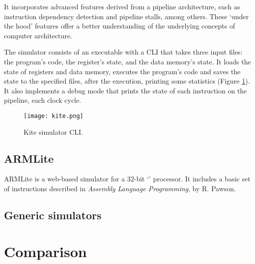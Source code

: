 It incorporates advanced features derived from a \gls{pipeline} architecture, such as \gls{instruction dependency} detection and \gls{pipeline stalls}, among others. These `under the hood' features offer a better understanding of the underlying concepts of computer architecture.

The simulator consists of an executable with a \gls{CLI} that takes three input files: the program's code, the register's state, and the data memory's state. It loads the state of registers and data memory, executes the program's code and saves the state to the specified files, after the execution, printing some statistics (Figure \ref{fig:kite}). It also implements a \gls{debug} mode that prints the state of each instruction on the \gls{pipeline}, each \gls{clock cycle}.

\begin{figure}[h]
  \caption{Kite simulator \gls{CLI}.}
  \texttt{[image: kite.png]}
  \label{fig:kite}
\end{figure}



\subsection*{ARMLite}  %
ARMLite\supercite{ARMLite} is a web-based simulator for a 32-bit `' processor. It includes a basic set of instructions described in \textit{Assembly Language Programming}\supercite{PawsonRichard.2020Ass}, by R. Pawson.


\subsection{Generic simulators}\label{subsec:generic-assembly-simulators}







\section{Comparison}\label{sec:comparison}



